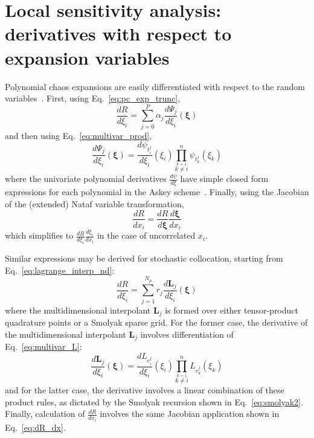 \section{Local sensitivity analysis: derivatives with respect to expansion variables} \label{uq:expansion:rvsa}

Polynomial chaos expansions are easily differentiated with respect to
the random variables~\cite{reagan_sens}.  First, using
Eq.~\ref{eq:pc_exp_trunc},
\begin{equation}
\frac{dR}{d\xi_i} = \sum_{j=0}^P \alpha_j 
\frac{d\Psi_j}{d\xi_i}(\boldsymbol{\xi}) \label{eq:dR_dxi_pce}
\end{equation}
and then using Eq.~\ref{eq:multivar_prod}, 
\begin{equation}
\frac{d\Psi_j}{d\xi_i}(\boldsymbol{\xi}) = \frac{d\psi_{t_i^j}}{d\xi_i}(\xi_i)
\prod_{\stackrel{\scriptstyle k=1}{k \ne i}}^n \psi_{t_k^j}(\xi_k)
\label{eq:deriv_prod_pce}
\end{equation}
where the univariate polynomial derivatives $\frac{d\psi}{d\xi}$
have simple closed form expressions for each polynomial in the Askey
scheme~\cite{abram_stegun}.  Finally, using the Jacobian of the
(extended) Nataf variable transformation,
\begin{equation}
\frac{dR}{dx_i} = \frac{dR}{d\boldsymbol{\xi}} 
\frac{d\boldsymbol{\xi}}{dx_i} \label{eq:dR_dx}
\end{equation}
which simplifies to $\frac{dR}{d\xi_i} \frac{d\xi_i}{dx_i}$ in the
case of uncorrelated $x_i$.  

Similar expressions may be derived for stochastic collocation, starting
from Eq.~\ref{eq:lagrange_interp_nd}:
\begin{equation}
\frac{dR}{d\xi_i} = \sum_{j=1}^{N_p} r_j 
\frac{d\boldsymbol{L}_j}{d\xi_i}(\boldsymbol{\xi}) \label{eq:dR_dxi_sc}
\end{equation}
where the multidimensional interpolant $\boldsymbol{L}_j$ is formed
over either tensor-product quadrature points or a Smolyak sparse grid.
For the former case, the derivative of the multidimensional
interpolant $\boldsymbol{L}_j$ involves differentiation of 
Eq.~\ref{eq:multivar_L}:
\begin{equation}
\frac{d\boldsymbol{L}_j}{d\xi_i}(\boldsymbol{\xi}) = 
\frac{dL_{c_i^j}}{d\xi_i}(\xi_i)
\prod_{\stackrel{\scriptstyle k=1}{k \ne i}}^n L_{c_k^j}(\xi_k) \label{eq:deriv_prod_sc}
\end{equation}
and for the latter case, the derivative involves a linear combination
of these product rules, as dictated by the Smolyak recursion shown in
Eq.~\ref{eq:smolyak2}.  Finally, calculation of $\frac{dR}{dx_i}$
involves the same Jacobian application shown in Eq.~\ref{eq:dR_dx}.

